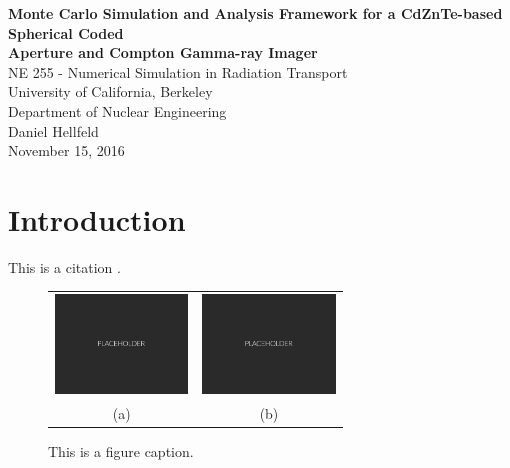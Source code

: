 \documentclass[10pt]{article}
\begin{document}
\begin{centering}
\textbf{Monte Carlo Simulation and Analysis Framework for a CdZnTe-based Spherical Coded\\[-5pt] Aperture and Compton Gamma-ray Imager}\\
\vspace{5pt}
NE 255 - Numerical Simulation in Radiation Transport \\[-5pt]
University of California, Berkeley \\[-5pt]
Department of Nuclear Engineering\\
\vspace{5pt}
Daniel Hellfeld\\
\vspace{5pt}
November 15, 2016 \\
\end{centering}


\section{Introduction}

\lipsum[1] 

\vspace{10pt}
This is a citation \cite{Agostinelli2003}.


\begin{figure}[htb]
\hypertarget{fig1}{}
\centering
\begin{tabular}{cc}
	\includegraphics[width=100pt]{Figures/Placeholder.png} & 
	\includegraphics[width=100pt]{Figures/Placeholder.png} \\
	\scriptsize{(a)} & \scriptsize{(b)}
\end{tabular}
\caption{This is a figure caption.}
\end{figure}
\end{document}
